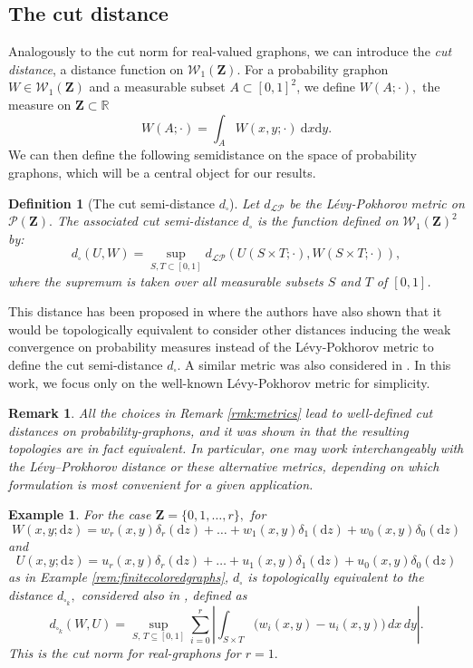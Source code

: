 \documentclass[12pt,twoside,a4paper]{article}
\newtheorem{definition}[theorem]{Definition}
\newtheorem{example}[theorem]{Example}
\newtheorem{remark}[theorem]{Remark}
\def\R{\mathbb{R}}
\newcommand{\Space}{\mathbf{Z}}
\newcommand{\Graphon}{\mathcal{W}_1}
\newcommand{\drv}{\mathrm{d}}
\begin{document}
\subsection{The cut distance}\label{section_def_dcut}
Analogously to the cut norm for real-valued graphons, we can introduce the \emph{cut  distance}, a distance function on $\Graphon(\Space)$.
For a probability graphon $W\in\Graphon(\Space)$ and a measurable subset $A\subset [0,1]^2$, we define $W(A;\cdot),$ the measure on $\Space\subset\R$
\[
  W(A;\cdot) = \int_{A} W(x,y;\cdot)\ \drv x \drv y.
\]
We can then define  the following semidistance on the space of probability graphons, which will be a central object for our results.

\begin{definition}[The cut semi-distance $d_{\square}$]
Let $d_{\mathcal{LP}}$ be the Lévy-Pokhorov metric on $\mathcal{P}(\mathbf{Z}).$ The associated cut semi-distance $d_{\square}$ is the function defined on $\Graphon(\Space)^2$ by:
\begin{equation}\label{cutsemi-disteq}
    d_{\square}(U, W)=\sup _{S, T \subset[0,1]} d_{\mathcal{LP}}(U(S \times T ; \cdot), W(S \times T ; \cdot)),
\end{equation}
where the supremum is taken over all measurable subsets $S$ and $T$ of $[0,1]$.
\end{definition}
This distance has been proposed in \cite{abraham2023probabilitygraphons} where the authors have also  shown that it would be topologically equivalent to consider other distances inducing the weak convergence on probability measures instead of the Lévy-Pokhorov metric to define the cut semi-distance $d_{\square}.$ A similar metric was also considered in \cite{athreya2023pathconvergencemarkovchains}. 
In this work, we focus only on the well-known Lévy-Pokhorov metric for simplicity.

\begin{remark}\label{rmk:metrics_2}
All the choices in Remark \ref{rmk:metrics} lead to well-defined cut distances on probability-graphons, and it was shown in \cite[Proposition~1.1]{abraham2023probabilitygraphons} that the resulting topologies are in fact equivalent. 
In particular, one may work interchangeably with the Lévy--Prokhorov distance or these alternative metrics, depending on which formulation is most convenient for a given application.
\end{remark}

\begin{example}
\label{rmk:finitecoloredMetrics}
For the case $\Space=\{0,1,\ldots,r\},$ for 
 $$
W(x,y;\mathrm{d}z)  =w_{r}(x,y)\delta_r(\mathrm{d} z)+\ldots +w_1(x,y)  \delta_1(\mathrm{d} z) +  w_0(x,y) \delta_0(\mathrm{d} z)$$
and 
$$
U(x,y;\mathrm{d}z)  =u_{r}(x,y)\delta_r(\mathrm{d} z)+\ldots +u_1(x,y)  \delta_1(\mathrm{d} z) +  u_0(x,y) \delta_0(\mathrm{d} z)$$
as in Example \ref{rem:finitecoloredgraphs}, $d_{\square}$ is topologically equivalent to the distance $d_{\square_k},$ considered also in \cite{falgasravry2016multicolour}, defined as
\[
d_{\square_k}(W,U)=\sup_{S,\,T \subseteq [0,1]}
\sum_{i=0}^{r} 
\left|\int_{S \times T} \bigl( w_i(x,y) - u_i(x,y) \bigr) \, dx \, dy \right|.
\]
This is the cut norm for real-graphons for $r=1.$
\end{example}
\end{document}
